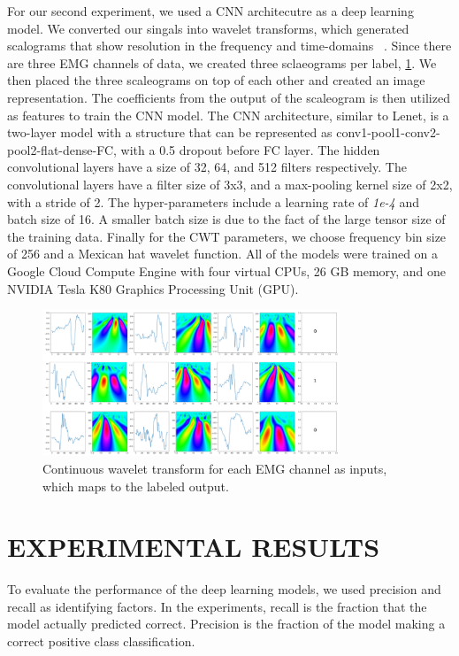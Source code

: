 \documentclass{article}
\begin{document}
For our second experiment, we used a CNN architecutre as a deep learning model. We converted our singals into wavelet transforms, which generated scalograms that show resolution in the frequency and time-domains ~\cite{wletCNN}. Since there are three EMG channels of data, we created three sclaeograms per label, \figurename \ref{fig: wavelet_signals}. We then placed the three scaleograms on top of each other and created an image representation. The coefficients from the output of the scaleogram is then utilized as features to train the CNN model. The CNN architecture, similar to Lenet, is a two-layer model with a structure that can be represented as conv1-pool1-conv2-pool2-flat-dense-FC, with a  0.5 dropout before FC layer. The hidden convolutional layers have a size of 32, 64, and 512 filters respectively. The convolutional layers have a filter size of 3x3, and a max-pooling kernel size of 2x2, with a stride of 2. The hyper-parameters include a learning rate of \textit{1e-4} and batch size of 16. A smaller batch size is due to the fact of the large tensor size of the training data. Finally for the CWT parameters, we choose frequency bin size of 256 and a Mexican hat wavelet function. All of the models were trained on a Google Cloud Compute Engine with four virtual CPUs, 26 GB memory, and one NVIDIA Tesla K80 Graphics Processing Unit (GPU).

\begin{figure}[!tb]
\centering
\includegraphics[width=3.5in]{images/wavelet_signal.png}
\caption{Continuous wavelet transform for each EMG channel as inputs, which maps to the labeled output.}
\label{fig: wavelet_signals}
\end{figure}

\section{EXPERIMENTAL RESULTS}
\label{sec:EXPERIMENTAL RESULTS}
To evaluate the performance of the deep learning models, we used precision and recall as identifying factors. In the experiments, recall is the fraction that the model actually predicted correct. Precision is the fraction of the model making a correct positive class classification.
\end{document}
